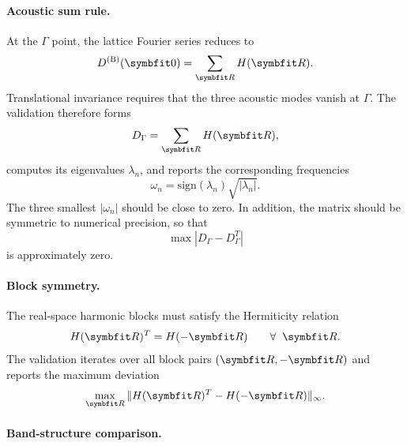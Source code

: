 \paragraph{Acoustic sum rule.}

At the $\Gamma$ point, the lattice Fourier series reduces to
\begin{equation}
  D^{(\mathrm{B})}(\vc{0}) = \sum_{\vc{R}} H(\vc{R}).
\end{equation}
Translational invariance requires that the three acoustic modes vanish
at $\Gamma$.  The validation therefore forms
\begin{equation}
  D_\Gamma = \sum_{\vc{R}} H(\vc{R}),
\end{equation}
computes its eigenvalues $\lambda_n$, and reports the corresponding
frequencies
\begin{equation}
  \omega_n = \mathrm{sign}(\lambda_n)\sqrt{|\lambda_n|}.
\end{equation}
The three smallest $|\omega_n|$ should be close to zero.  In addition,
the matrix should be symmetric to numerical precision, so that
\begin{equation}
  \max |D_\Gamma - D_\Gamma^T|
\end{equation}
is approximately zero.

\paragraph{Block symmetry.}

The real-space harmonic blocks must satisfy the Hermiticity relation
\begin{equation}\label{eq:block_sym}
  H(\vc{R})^T = H(-\vc{R})
  \qquad \forall\;\vc{R}.
\end{equation}
The validation iterates over all block pairs
$(\vc{R},-\vc{R})$ and reports the maximum deviation
\begin{equation}
  \max_{\vc{R}}
  \|H(\vc{R})^T - H(-\vc{R})\|_\infty.
\end{equation}

\paragraph{Band-structure comparison.}


